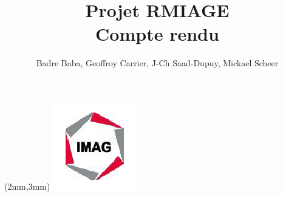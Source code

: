 \documentclass[a4paper,10pt,twoside]{article}
\begin{document}
\title{Projet RMIAGE\\ \Huge{Compte rendu}}
\author{
	Badre Baba, Geoffroy Carrier, J-Ch Saad-Dupuy, Mickael Scheer
}

\begin{center}
\begin{textblock*}{35cm}(2mm,3mm)
\includegraphics[scale=0.8]{../cc/imag_logo.png}
\end{textblock*}
\end{center}
 
\maketitle
\tableofcontents
\pagebreak






\end{document}
